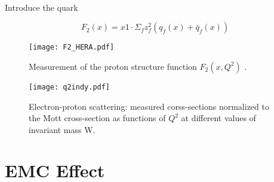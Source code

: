 \paragraph{} 

Introduce the quark


\begin{equation}
\label{F2q}
F_2(x) = x1 \cdot \Sigma_f z^2_f ( q_f(x) + \bar{q}_f(x))
\end{equation}


\begin{figure}[]
	\texttt{[image: F2\_HERA.pdf]} 
	\caption{ Measurement of the proton structure function $F_2(x, Q^2)$ \cite{F2_HERA}.}
	\label{F2_HERA_fig}
\end{figure} 

\begin{figure}[]
	\texttt{[image: q2indy.pdf]} 
	\caption{ Electron-proton scattering: measured corss-sections normalized to the Mott cross-section as functions of $Q^2$ at different values of invariant mass W\cite{Q2indy}.}
	\label{q2indy_fig}
\end{figure} 

	\cite{DISearly}
	\cite{DISproton}
	\cite{whitlow_sigma}
	\cite{Q2indy}
	
	
	
\section{EMC Effect}\label{sec:EMC}
